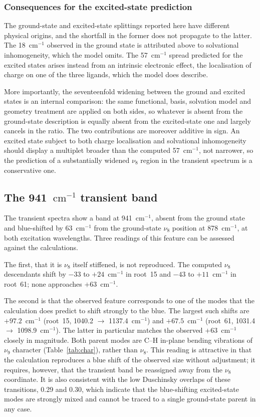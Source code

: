 \documentclass[11pt,a4paper]{article}
\newcommand{\wn}{\ensuremath{\mathrm{cm^{-1}}}}
\begin{document}
\subsubsection*{Consequences for the excited-state prediction}

The ground-state and excited-state splittings reported here have different
physical origins, and the shortfall in the former does not propagate to the
latter. The 18~\wn{} observed in the ground state is attributed above to
solvational inhomogeneity, which the model omits. The 57~\wn{} spread predicted
for the excited states arises instead from an intrinsic electronic effect,
the localisation of charge on one of the three ligands, which the model does
describe.

More importantly, the seventeenfold widening between the ground and excited
states is an internal comparison: the same functional, basis, solvation model
and geometry treatment are applied on both sides, so whatever is absent from
the ground-state description is equally absent from the excited-state one and
largely cancels in the ratio. The two contributions are moreover additive in
sign. An excited state subject to both charge localisation and solvational
inhomogeneity should display a multiplet broader than the computed 57~\wn{},
not narrower, so the prediction of a substantially widened $\nu_8$ region in
the transient spectrum is a conservative one.

\subsection{The 941~\wn{} transient band}

The transient spectra show a band at 941~\wn{}, absent from the ground state
and blue-shifted by 63~\wn{} from the ground-state $\nu_8$ position at
878~\wn{}, at both excitation wavelengths. Three readings of this feature can
be assessed against the calculations.

The first, that it is $\nu_8$ itself stiffened, is not reproduced. The
computed $\nu_8$ descendants shift by $-33$ to $+24$~\wn{} in root~15 and
$-43$ to $+11$~\wn{} in root~61; none approaches $+63$~\wn{}.

The second is that the observed feature corresponds to one of the modes that
the calculation does predict to shift strongly to the blue. The largest such
shifts are $+97.2$~\wn{} (root~15, 1040.2 $\to$ 1137.4~\wn{}) and
$+67.5$~\wn{} (root~61, 1031.4 $\to$ 1098.9~\wn{}). The latter in particular
matches the observed $+63$~\wn{} closely in magnitude. Both parent modes are
C--H in-plane bending vibrations of $\nu_9$ character
(Table~\ref{tab:char}), rather than $\nu_8$. This reading is attractive in
that the calculation reproduces a blue shift of the observed size without
adjustment; it requires, however, that the transient band be reassigned away
from the $\nu_8$ coordinate. It is also consistent with the low Duschinsky
overlaps of these transitions, 0.29 and 0.30, which indicate that the
blue-shifting excited-state modes are strongly mixed and cannot be traced to a
single ground-state parent in any case.
\end{document}
